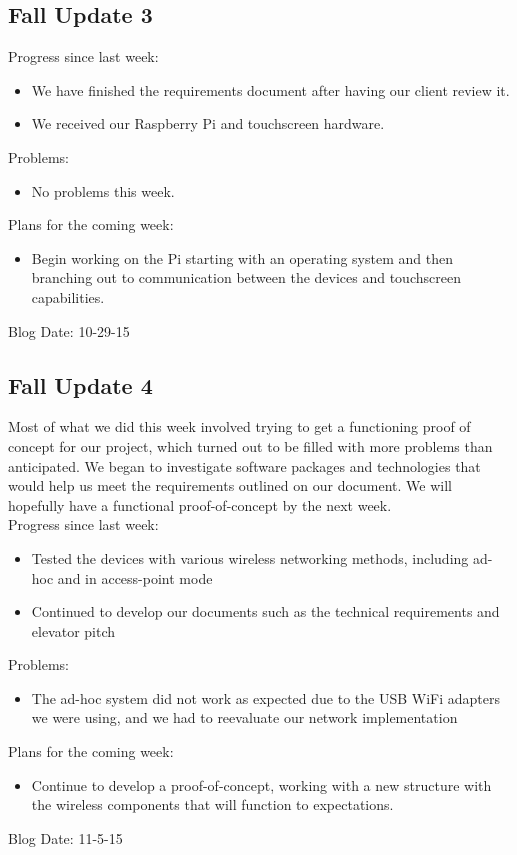 \subsection{Fall Update 3}
Progress since last week:
\begin{itemize}
   \item We have finished the requirements document after having our client review it.
   \item We received our Raspberry Pi and touchscreen hardware.
\end{itemize}
Problems:
\begin{itemize}
   \item No problems this week.
\end{itemize}
Plans for the coming week:
\begin{itemize}
   \item Begin working on the Pi starting with an operating system and then branching out to communication between the devices and touchscreen capabilities.
\end{itemize}
Blog Date: 10-29-15


\subsection{Fall Update 4}
Most of what we did this week involved trying to get a functioning proof of concept for our project, which turned out to be filled with more problems than anticipated. We began to investigate software packages and technologies that would help us meet the requirements outlined on our document. We will hopefully have a functional proof-of-concept by the next week.\\
Progress since last week:
\begin{itemize}
   \item Tested the devices with various wireless networking methods, including ad-hoc and in access-point mode
   \item Continued to develop our documents such as the technical requirements and elevator pitch
\end{itemize}
Problems:
\begin{itemize}
   \item The ad-hoc system did not work as expected due to the USB WiFi adapters we were using, and we had to reevaluate​ our network implementation
\end{itemize}
Plans for the coming week:
\begin{itemize}
   \item Continue to develop a proof-of-concept, working with a new structure with the wireless components that will function to expectations.
\end{itemize}
Blog Date: 11-5-15

